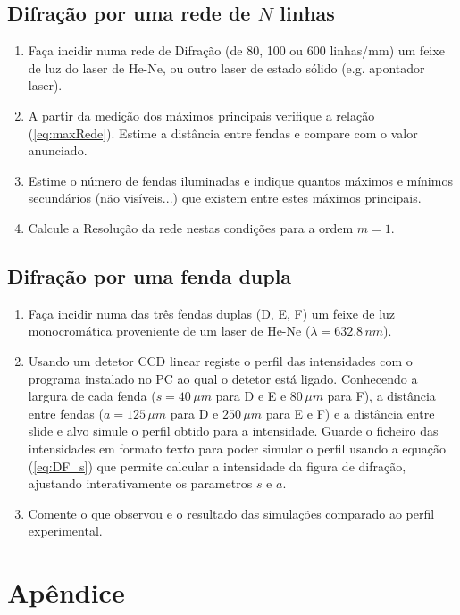 \documentclass[a4paper,12pt]{article}
\begin{document}
\subsection{\sf Difração por uma rede de $N$ linhas}
\begin{enumerate}
\item Faça incidir numa rede de Difração (de 80, 100 ou 600 linhas/mm) um 
feixe de luz do laser de He-Ne, ou outro laser de estado sólido (e.g. apontador laser).
\item A partir da medição dos máximos principais verifique a relação  (\ref{eq:maxRede}).
Estime a distância entre fendas e compare com o valor anunciado.
\item Estime o número de fendas iluminadas e indique quantos máximos e mínimos secundários (não visíveis...) que existem 
entre estes máximos principais.
\item Calcule a Resolução da rede nestas condições para a ordem $m=1$. 
\end{enumerate}


\subsection{\sf Difração por uma fenda dupla}

\begin{enumerate}
\item Faça incidir numa das três fendas duplas (D, E, F) um feixe de luz monocromática 
proveniente de um laser de He-Ne ($\lambda=632.8\,nm$).  
\item Usando um detetor CCD linear registe o perfil das intensidades com o programa instalado 
no PC ao qual o detetor está ligado. Conhecendo a largura de cada fenda ($s=40\, 
\mu m$ para D e E e $80\,\mu m$ para F), a distância entre fendas ($a=125\,\mu m$ para D e 
$250\,\mu m$  para  E  e  F) e a distância entre slide e alvo  simule  o  perfil  obtido  para  a  intensidade.  Guarde  o  ficheiro  das 
intensidades  em  formato  texto  para  poder  simular  o  perfil  usando  a  equação (\ref{eq:DF_s}) que 
permite calcular a intensidade da figura de difração, ajustando interativamente os parametros $s$ e $a$. 
\item Comente  o  que  observou  e  o  resultado  das  simulações  comparado  ao  perfil 
experimental. 
\end{enumerate}

\section{\sf Apêndice}
\end{document}
